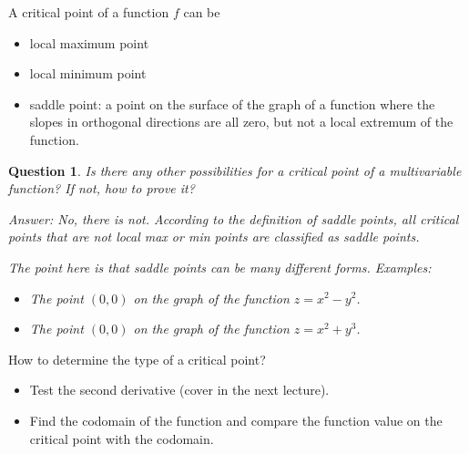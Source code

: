 \documentclass{article}
\newtheorem{question}{Question}
\begin{document}
A critical point of a function $f$ can be 
\begin{itemize}
  \item local maximum point
  \item local minimum point
  \item saddle point: a point on the surface of the graph of a function where 
    the slopes in orthogonal directions are all zero, but not a local extremum 
    of the function.
\end{itemize}

\begin{question}
  Is there any other possibilities for a critical point of a multivariable 
  function? If not, how to prove it?

  Answer: No, there is not. According to the definition of saddle points, all 
  critical points that are not local max or min points are classified as saddle 
  points.

  The point here is that saddle points can be many different forms. Examples:
  \begin{itemize}
    \item The point $(0, 0)$ on the graph of the function $z = x^2 - y^2$.
    \item The point $(0, 0)$ on the graph of the function $z = x^2 + y^3$.
  \end{itemize}
\end{question}

How to determine the type of a critical point?
\begin{itemize}
  \item Test the second derivative (cover in the next lecture).
  \item Find the codomain of the function and compare the function value on the 
  critical point with the codomain.
\end{itemize}
\end{document}
